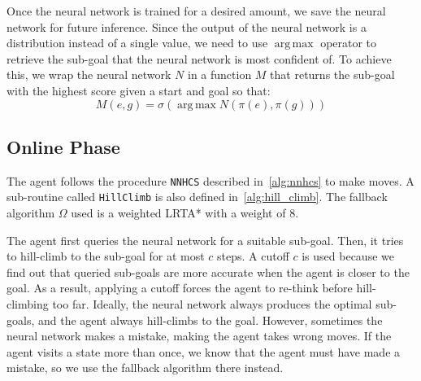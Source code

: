 \documentclass[letterpaper]{article}
\numberwithin{equation}{section}
\numberwithin{theorem}{section}
\numberwithin{lemma}{section}
\numberwithin{df}{section}
\DeclareMathOperator*{\argmax}{arg\,max}
\begin{document}
    Once the neural network is trained for a desired amount, we save the neural network for future inference.
    Since the output of the neural network is a distribution instead of a single value, we need to use $\argmax$ operator to retrieve the sub-goal that the neural network is most confident of.
    To achieve this, we wrap the neural network $N$ in a function $M$ that returns the sub-goal with the highest score given a start and goal so that:
    \[ M(e, g) = \sigma(\argmax N(\pi(e), \pi(g))) \]

    \subsection{Online Phase}

    The agent follows the procedure \texttt{NNHCS} described in~\ref{alg:nnhcs} to make moves.
    A sub-routine called \texttt{HillClimb} is also defined in~\ref{alg:hill_climb}.
    The fallback algorithm $\Omega$ used is a weighted LRTA* with a weight of 8.

    The agent first queries the neural network for a suitable sub-goal.
    Then, it tries to hill-climb to the sub-goal for at most $c$ steps.
    A cutoff $c$ is used because we find out that queried sub-goals are more accurate when the agent is closer to the goal.
    As a result, applying a cutoff forces the agent to re-think before hill-climbing too far.
    Ideally, the neural network always produces the optimal sub-goals, and the agent always hill-climbs to the goal.
    However, sometimes the neural network makes a mistake, making the agent takes wrong moves.
    If the agent visits a state more than once, we know that the agent must have made a mistake, so we use the fallback algorithm there instead.
\end{document}
